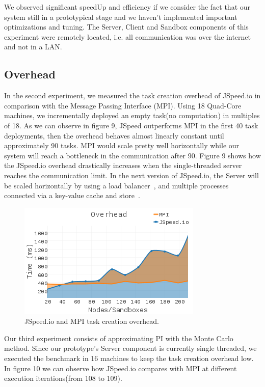 \documentclass[10pt,reprint]{socc14}
\begin{document}
We observed significant speedUp and efficiency if we consider the fact that our system still in a prototypical stage and we haven’t implemented important optimizations and tuning. The Server, Client and Sandbox components of this experiment were remotely located, i.e. all communication was over the internet and not in a LAN.


\subsection{Overhead}

In the second experiment, we measured the task creation overhead of JSpeed.io in comparison with the Message Passing Interface (MPI). Using 18 Quad-Core machines, we incrementally deployed an empty task(no computation) in multiples of 18. As we can observe in figure 9, JSpeed outperforms MPI in the first 40 task deployments, then the overhead behaves almost linearly constant until approximately 90 tasks. MPI would scale pretty well horizontally while our system will reach a bottleneck in the communication after 90. Figure 9 shows how the JSpeed.io overhead drastically increases when the single-threaded server reaches the communication limit. In the next version of JSpeed.io, the Server will be scaled horizontally by using a load balancer~\cite{Nginx}, and multiple processes connected via a key-value cache and store~\cite{Redis}.

\begin{figure}	
	\centering
	\includegraphics[scale=3.0]{Overhead}
	\caption{JSpeed.io and MPI task creation overhead.}
\end{figure}


Our third experiment consists of approximating PI with the Monte Carlo method. Since our prototype’s Server component is currently single threaded, we executed the benchmark in 16 machines to keep the task creation overhead low. In figure 10 we can observe how JSpeed.io compares with MPI at different execution iterations(from 108 to 109).
\end{document}
